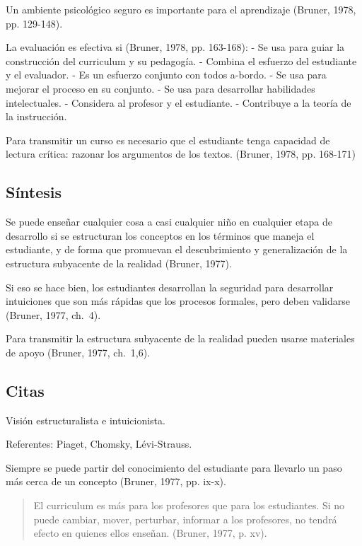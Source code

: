 \documentclass[
  12,
]{scrartcl}
\begin{document}
Un ambiente psicológico seguro es importante para el aprendizaje
(Bruner, 1978, pp. 129-148).

La evaluación es efectiva si (Bruner, 1978, pp. 163-168): - Se usa para
guiar la construcción del curriculum y su pedagogía. - Combina el
esfuerzo del estudiante y el evaluador. - Es un esfuerzo conjunto con
todos a-bordo. - Se usa para mejorar el proceso en su conjunto. - Se usa
para desarrollar habilidades intelectuales. - Considera al profesor y el
estudiante. - Contribuye a la teoría de la instrucción.

Para transmitir un curso es necesario que el estudiante tenga capacidad
de lectura crítica: razonar los argumentos de los textos. (Bruner, 1978,
pp. 168-171)

\hypertarget{suxedntesis}{%
\subsection{Síntesis}\label{suxedntesis}}

Se puede enseñar cualquier cosa a casi cualquier niño en cualquier etapa
de desarrollo si se estructuran los conceptos en los términos que maneja
el estudiante, y de forma que promuevan el descubrimiento y
generalización de la estructura subyacente de la realidad (Bruner,
1977).

Si eso se hace bien, los estudiantes desarrollan la seguridad para
desarrollar intuiciones que son más rápidas que los procesos formales,
pero deben validarse (Bruner, 1977, ch.~4).

Para transmitir la estructura subyacente de la realidad pueden usarse
materiales de apoyo (Bruner, 1977, ch.~1,6).

\hypertarget{citas}{%
\subsection{Citas}\label{citas}}

Visión estructuralista e intuicionista.

Referentes: Piaget, Chomsky, Lévi-Strauss.

Siempre se puede partir del conocimiento del estudiante para llevarlo un
paso más cerca de un concepto (Bruner, 1977, pp. ix-x).

\begin{quote}
El curriculum es más para los profesores que para los estudiantes. Si no
puede cambiar, mover, perturbar, informar a los profesores, no tendrá
efecto en quienes ellos enseñan. (Bruner, 1977, p. xv).
\end{quote}
\end{document}

